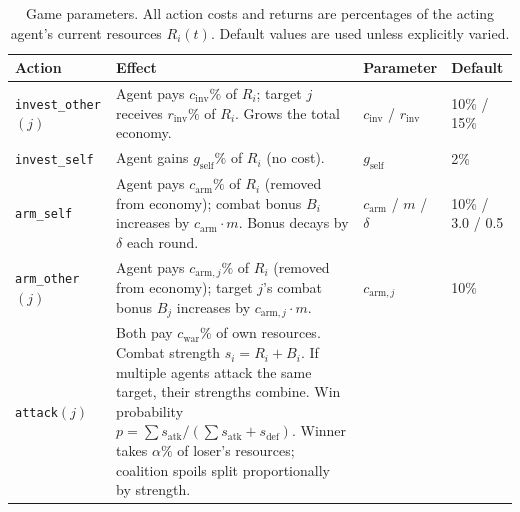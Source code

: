

\begin{table}[ht]
\centering
\caption{Game parameters. All action costs and returns are percentages of the acting agent's current resources $R_i(t)$. Default values are used unless explicitly varied.}
\label{tab:base_params}
\begin{tabular}{lp{6.2cm}ll}
\hline
\textbf{Action} & \textbf{Effect} & \textbf{Parameter} & \textbf{Default} \\
\hline
\texttt{invest\_other}$(j)$
    & Agent pays $c_{\text{inv}}\%$ of $R_i$; target $j$ receives $r_{\text{inv}}\%$ of $R_i$. Grows the total economy.
    & $c_{\text{inv}}$ / $r_{\text{inv}}$
    & 10\% / 15\% \\[6pt]
\texttt{invest\_self}
    & Agent gains $g_{\text{self}}\%$ of $R_i$ (no cost).
    & $g_{\text{self}}$
    & 2\% \\[6pt]
\texttt{arm\_self}
    & Agent pays $c_{\text{arm}}\%$ of $R_i$ (removed from economy); combat bonus $B_i$ increases by $c_{\text{arm}} \cdot m$. Bonus decays by $\delta$ each round.
    & $c_{\text{arm}}$ / $m$ / $\delta$
    & 10\% / 3.0 / 0.5 \\[6pt]
\texttt{arm\_other}$(j)$
    & Agent pays $c_{\text{arm},j}\%$ of $R_i$ (removed from economy); target $j$'s combat bonus $B_j$ increases by $c_{\text{arm},j} \cdot m$.
    & $c_{\text{arm},j}$
    & 10\% \\[6pt]
\texttt{attack}$(j)$
    & Both pay $c_{\text{war}}\%$ of own resources. Combat strength $s_i = R_i + B_i$. If multiple agents attack the same target, their strengths combine. Win probability $p = \sum s_{\text{atk}} / (\sum s_{\text{atk}} + s_{\text{def}})$. Winner takes $\alpha\%$ of loser's resources; coalition spoils split proportionally by strength.

\end{tabular}
\end{table}
